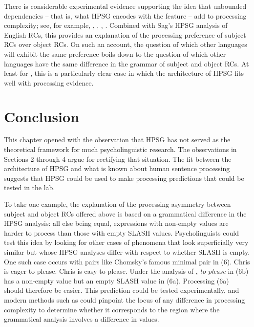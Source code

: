 \documentclass[a4paper]{article}
\begin{document}
There is considerable experimental evidence supporting the idea that unbounded dependencies -- that is, what HPSG encodes with the  feature -- add to processing complexity; see, for example, \citet{WannerMaratsos78}, \citet{KingJust91}, \citet{KluenderKutas93}, \citet{Hawkins99a}.  Combined with Sag's HPSG analysis of English RCs, this provides an explanation of the processing preference of subject RCs over object RCs.  On such an account, the question of which other languages will exhibit the same preference boils down to the question of which other languages have the same difference in the grammar of subject and object RCs.  At least for , this is a particularly clear case in which the architecture of HPSG fits well with processing evidence.

\section{Conclusion}

This chapter opened with the observation that HPSG has not served as the theoretical framework for much psycholinguistic research.  The observations in Sections 2 through 4 argue for rectifying that situation.  The fit between the architecture of HPSG and what is known about human sentence processing suggests that HPSG could be used to make processing predictions that could be tested in the lab.  

To take one example, the explanation of the processing asymmetry between subject and object RCs offered above is based on a grammatical difference in the HPSG analysis:  all else being equal, expressions with non-empty  values are harder to process than those with empty SLASH values.  Psycholinguists could test this idea by looking for other cases of phenomena that look superficially very similar but whose HPSG analyses differ with respect to whether SLASH is empty.  One such case occurs with pairs like  Chomsky's famous minimal pair in (6).
\eal
\ex Chris is eager to please.
\ex Chris is easy to please.
\zl
Under the analysis of \citet{ps2}, \emph{to please} in (6b) has a non-empty  value but an empty SLASH value in (6a).  Processing (6a) should therefore be easier.  This prediction could be tested experimentally, and modern methods such as  could pinpoint the locus of any difference in processing complexity to determine whether it corresponds to the region where the grammatical analysis involves a difference in  values.
\end{document}
